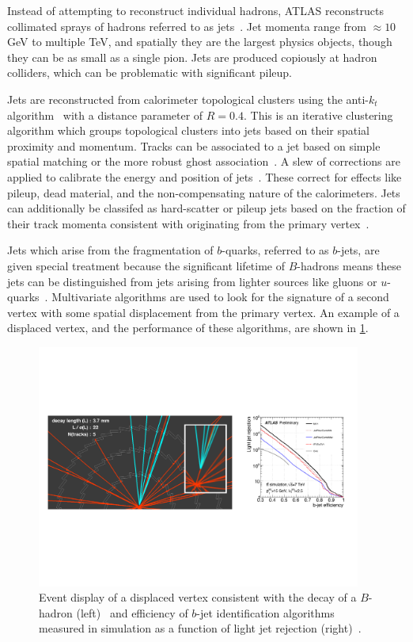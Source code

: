 Instead of attempting to reconstruct individual hadrons, ATLAS reconstructs collimated sprays of hadrons referred to as jets~\cite{PERF-2012-01}. Jet momenta range from $\approx\!10$ GeV to multiple TeV, and spatially they are the largest physics objects, though they can be as small as a single pion. Jets are produced copiously at hadron colliders, which can be problematic with significant pileup.

Jets are reconstructed from calorimeter topological clusters using the anti-$k_t$ algorithm~\cite{2008.antikt} with a distance parameter of $R=0.4$. This is an iterative clustering algorithm which groups topological clusters into jets based on their spatial proximity and momentum. Tracks can be associated to a jet based on simple spatial matching or the more robust ghost association~\cite{ATLAS-CONF-2013-083}. A slew of corrections are applied to calibrate the energy and position of jets~\cite{PERF-2012-01,ATLAS-CONF-2013-083}. These correct for effects like pileup, dead material, and the non-compensating nature of the calorimeters. Jets can additionally be classifed as hard-scatter or pileup jets based on the fraction of their track momenta consistent with originating from the primary vertex~\cite{ATLAS-CONF-2014-018}.

Jets which arise from the fragmentation of $b$-quarks, referred to as $b$-jets, are given special treatment because the significant lifetime of $B$-hadrons means these jets can be distinguished from jets arising from lighter sources like gluons or $u$-quarks~\cite{ATLAS-CONF-2014-046}. Multivariate algorithms are used to look for the signature of a second vertex with some spatial displacement from the primary vertex. An example of a displaced vertex, and the performance of these algorithms, are shown in \cref{fig:objects-btag}.

\begin{figure}[tp]
  \centering
  \includegraphics[width=0.95\textwidth]{figures/performance/btag-ROC-display}
  \caption{Event display of a displaced vertex consistent with the decay of a $B$-hadron (left)~\cite{ATLAS-CONF-2010-004} and efficiency of $b$-jet identification algorithms measured in simulation as a function of light jet rejection (right)~\cite{ATLAS-CONF-2012-043}.}
  \label{fig:objects-btag}
\end{figure}


